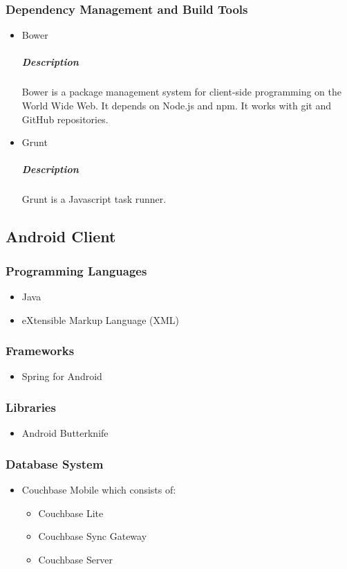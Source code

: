 \documentclass[a4paper,10pt]{article}
\begin{document}
\subsubsection{Dependency Management and Build Tools}
	\begin{itemize}
		\item Bower
			\subparagraph{Description}
				Bower is a package management system for client-side programming on the World Wide Web. It depends on Node.js and npm. It works with git and GitHub repositories.
		\item Grunt
			\subparagraph{Description}
				Grunt is a Javascript task runner.
	\end{itemize}

\subsection{Android Client}
\subsubsection{Programming Languages}
	\begin{itemize}
		\item Java
		\item eXtensible Markup Language (XML)
	\end{itemize}

\subsubsection{Frameworks}
	\begin{itemize}
		\item Spring for Android
	\end{itemize}

\subsubsection{Libraries}
	\begin{itemize}
		\item Android Butterknife
	\end{itemize}

\subsubsection{Database System}
	\begin{itemize}
		\item Couchbase Mobile which consists of:
		\begin{itemize}
			\item Couchbase Lite
			\item Couchbase Sync Gateway
			\item Couchbase Server
		\end{itemize}
	\end{itemize}
\end{document}
